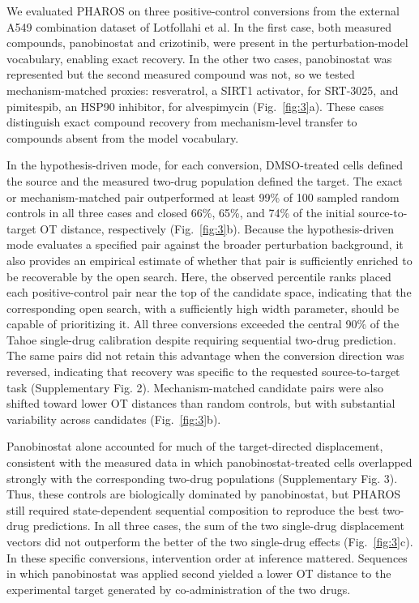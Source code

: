 \documentclass[11pt,a4paper]{article}
\begin{document}
We evaluated PHAROS on three positive-control conversions from the external A549 combination dataset of Lotfollahi et al\cite{Lotfollahi2023}. In the first case, both measured compounds, panobinostat and crizotinib, were present in the perturbation-model vocabulary, enabling exact recovery. In the other two cases, panobinostat was represented but the second measured compound was not, so we tested mechanism-matched proxies: resveratrol, a SIRT1 activator, for SRT-3025, and pimitespib, an HSP90 inhibitor, for alvespimycin (Fig.~\ref{fig:3}a). These cases distinguish exact compound recovery from mechanism-level transfer to compounds absent from the model vocabulary.

In the hypothesis-driven mode, for each conversion, DMSO-treated cells defined the source and the measured two-drug population defined the target. The exact or mechanism-matched pair outperformed at least 99\% of 100 sampled random controls in all three cases and closed 66\%, 65\%, and 74\% of the initial source-to-target OT distance, respectively (Fig.~\ref{fig:3}b). Because the hypothesis-driven mode evaluates a specified pair against the broader perturbation background, it also provides an empirical estimate of whether that pair is sufficiently enriched to be recoverable by the open search. Here, the observed percentile ranks placed each positive-control pair near the top of the candidate space, indicating that the corresponding open search, with a sufficiently high width parameter, should be capable of prioritizing it. All three conversions exceeded the central 90\% of the Tahoe single-drug calibration despite requiring sequential two-drug prediction. The same pairs did not retain this advantage when the conversion direction was reversed, indicating that recovery was specific to the requested source-to-target task (Supplementary Fig. 2). Mechanism-matched candidate pairs were also shifted toward lower OT distances than random controls, but with substantial variability across candidates (Fig.~\ref{fig:3}b).

Panobinostat alone accounted for much of the target-directed displacement, consistent with the measured data in which panobinostat-treated cells overlapped strongly with the corresponding two-drug populations (Supplementary Fig. 3). Thus, these controls are biologically dominated by panobinostat, but PHAROS still required state-dependent sequential composition to reproduce the best two-drug predictions. In all three cases, the sum of the two single-drug displacement vectors did not outperform the better of the two single-drug effects (Fig.~\ref{fig:3}c). In these specific conversions, intervention order at inference mattered. Sequences in which panobinostat was applied second yielded a lower OT distance to the experimental target generated by co-administration of the two drugs.
\end{document}
